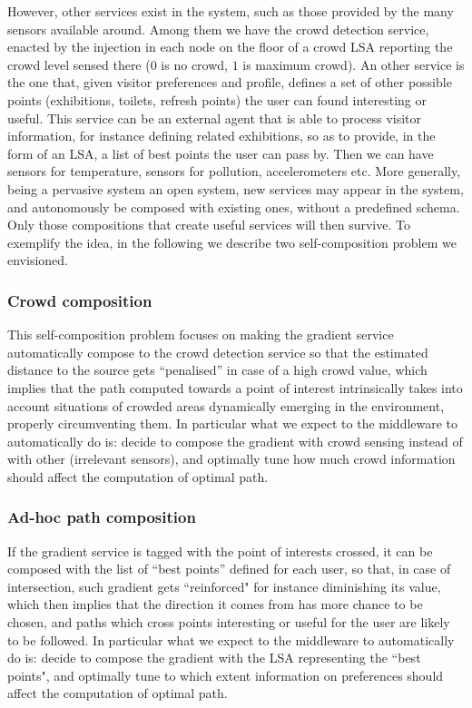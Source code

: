 \documentclass[12pt,a4paper,twoside,openright]{book}
\begin{document}
However, other services exist in the system, such as those provided by the many sensors available around.
%
Among them we have the crowd detection service, enacted by the injection in each node on the floor of a crowd LSA reporting the crowd level sensed there ($0$ is no crowd, $1$ is maximum crowd).
%
An other service is the one that, given visitor preferences and profile, defines a set of other possible points (exhibitions, toilets, refresh points) the user can found interesting or useful.
%
This service can be an external agent that is able to process visitor information, for instance defining related exhibitions, so as to provide, in the form of an LSA, a list of best points the user can pass by.
%
Then we can have sensors for temperature, sensors for pollution, accelerometers etc. 
%
More generally, being a pervasive system an open system, new services may appear in the system, and autonomously be composed with existing ones, without a predefined schema.
%
Only those compositions that create useful services will then survive.
%
To exemplify the idea, in the following we describe two self-composition problem we envisioned.

\subsubsection{Crowd composition}
This self-composition problem focuses on making the gradient service automatically compose to the crowd detection service so that the estimated distance to the source gets ``penalised'' in  case of a high crowd value, which implies that the path computed towards a point of interest intrinsically takes into account situations of crowded areas dynamically emerging in the environment, properly circumventing them.
%
In particular what we expect to the middleware to automatically do is: decide to compose the gradient with crowd sensing instead of with other (irrelevant sensors), and optimally tune how much crowd information should affect the computation of optimal path.

\subsubsection{Ad-hoc path composition}
If the gradient service is tagged with the point of interests crossed, it can be composed with the list of  ``best points'' defined for each user, so that, in case of intersection, such gradient gets ``reinforced" for instance diminishing its value, which then implies that the direction it comes from has more chance to be chosen, and paths which cross points interesting or useful for the user are likely to be followed. 
%
In particular what we expect to the middleware to automatically do is: decide to compose the gradient with the LSA representing the ``best points", and optimally tune to which extent information on preferences should affect the computation of optimal path. 
\end{document}
